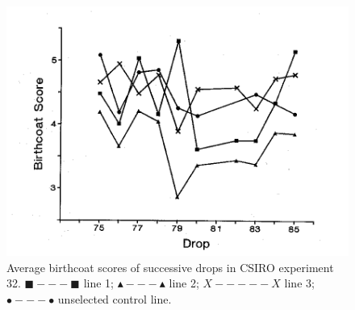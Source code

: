 %

\begin{figure}[h]
  \centering
  \includegraphics[width=\textwidth,trim = 0 0 0 120]{images/fig12.png}
  \caption{Average birthcoat scores of successive drops in CSIRO experiment
      32. $\blacksquare---\blacksquare$ line 1;  $\blacktriangle---\blacktriangle$ line 2; $X-----X$
      line 3;  $\bullet---\bullet$  unselected control line.}
  \label{fig:12}
\end{figure}

%
